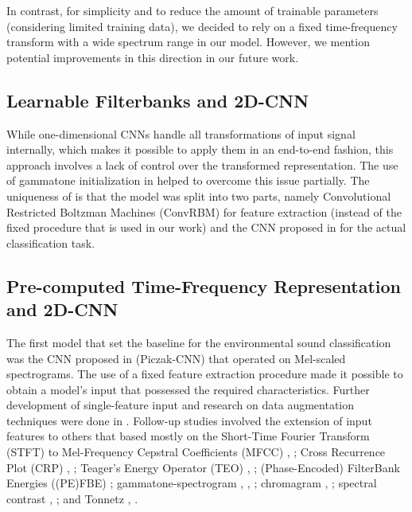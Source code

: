 \documentclass[a4paper,conference]{IEEEtran}
\begin{document}
In contrast, for simplicity and to reduce the amount of trainable parameters (considering limited training data), we decided to rely on a fixed time-frequency transform with a wide spectrum range in our model.
However, we mention potential improvements in this direction in our future work.

\subsection{Learnable Filterbanks and 2D-CNN} \label{ssec:learn_fb}
While one-dimensional CNNs handle all transformations of input signal internally, which makes it possible to apply them in an end-to-end fashion, this approach involves a lack of control over the transformed representation.
The use of gammatone initialization in \cite{abdoli2019cnn1d} helped to overcome this issue partially.
The uniqueness of \cite{sailor2017convrbm} is that the model was split into two parts, namely Convolutional Restricted Boltzman Machines (ConvRBM) for feature extraction (instead of the fixed procedure that is used in our work) and the CNN proposed in \cite{piczak2015cnn} for the actual classification task.


\subsection{Pre-computed Time-Frequency Representation and 2D-CNN} \label{ssec:tf_cnn}
The first model that set the baseline for the environmental sound classification was the CNN proposed in \cite{piczak2015cnn} (Piczak-CNN) that operated on Mel-scaled \cite{volkmann1937mel} spectrograms.
The use of a fixed feature extraction procedure made it possible to obtain a model's input that possessed the required characteristics.
Further development of single-feature input and research on data augmentation techniques were done in \cite{salamon2017cnn}.
Follow-up studies involved the extension of input features to others that based mostly on the Short-Time Fourier Transform (STFT) \cite{allen1977stft} to Mel-Frequency Cepstral Coefficients (MFCC) \cite{logan2000mel}, \cite{boddapati2017classifying}; Cross Recurrence Plot (CRP) \cite{marwan2002crp}, \cite{boddapati2017classifying}; Teager's Energy Operator (TEO) \cite{kaiser1993teo}, \cite{agrawal2017teo}; (Phase-Encoded) FilterBank Energies ((PE)FBE) \cite{tak2017pefbe}; gammatone-spectrogram \cite{slaney1993gammatone}, \cite{zhang2018mixup}, \cite{zhang2019crnn}; chromagram \cite{shepard1964chroma}, \cite{su2019tscnnds}; spectral contrast \cite{jiang2002spectral}, \cite{su2019tscnnds}; and Tonnetz \cite{harte2006tonnetz}, \cite{su2019tscnnds}.
\end{document}
